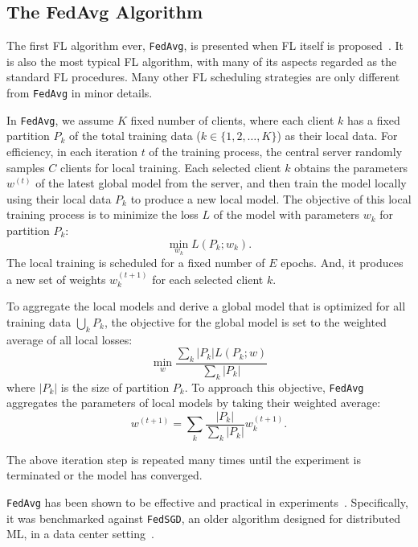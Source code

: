 \documentclass[conference]{IEEEtran}
\begin{document}
\subsection{The FedAvg Algorithm}

The first FL algorithm ever, \verb|FedAvg|,
is presented when FL itself is proposed~\cite{mcmahan2017communication}.
It is also the most typical FL algorithm,
with many of its aspects regarded as the standard FL procedures.
Many other FL scheduling strategies are only different from \verb|FedAvg| in
minor details.

In \verb|FedAvg|,
we assume $K$ fixed number of clients,
where each client $k$ has a fixed partition $P_k$ of
the total training data ($k \in \{1, 2, \dots, K\}$) as their local data.
For efficiency,
in each iteration $t$ of the training process,
the central server randomly samples $C$ clients for local training.
Each selected client $k$ obtains the parameters $w^{(t)}$ of
the latest global model from the server,
and then train the model locally using their local data $P_k$
to produce a new local model.
The objective of this local training process is to minimize the loss $L$ of
the model with parameters $w_k$ for partition $P_k$:
\begin{equation}
    \min_{w_k} L(P_k;w_k).
\end{equation}
The local training is scheduled for a fixed number of $E$ epochs.
And, it produces a new set of weights $w_k^{(t+1)}$ for
each selected client $k$.

To aggregate the local models and derive a global model that
is optimized for all training data $\bigcup_k P_k$,
the objective for the global model is set to
the weighted average of all local losses:
\begin{equation}
    \min_{w} \frac{\sum_k |P_k|L(P_k;w)}{\sum_k |P_k|}
\end{equation}
where $|P_k|$ is the size of partition $P_k$.
To approach this objective,
\verb|FedAvg| aggregates the parameters of local models by
taking their weighted average:
\begin{equation}
    w^{(t+1)}=\sum_k \frac{|P_k|}{\sum_k |P_k|}w_k^{(t+1)}.
\end{equation}

The above iteration step is repeated many times until
the experiment is terminated or
the model has converged.

\verb|FedAvg| has been shown to be effective and practical
in experiments~\cite{mcmahan2017communication}.
Specifically, it was benchmarked against \verb|FedSGD|\cite{chen2016revisiting},
an older algorithm designed for distributed ML,
in a data center setting~\cite{bonawitz2019towards}.
\end{document}

